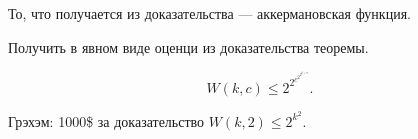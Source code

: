 \begin{normalsize}
То, что получается из доказательства --- аккермановская функция.

\begin{exerc}
    Получить в явном виде оценци из доказательства теоремы.
\end{exerc}

\begin{theorem} [Gowers, 2001]
    \[ W(k, c) \leq 2^{ 2^{ c^{ 2^{ 2^{ k + 9}}}}}. \]
\end{theorem}

\begin{notice}
    Грэхэм: 1000\$ за доказательство $W(k, 2) \leq 2^{ k^2 }$.
\end{notice}

\end{normalsize}